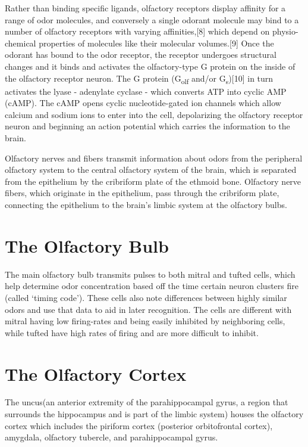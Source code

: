 Rather than binding specific ligands, olfactory receptors display affinity for a range of odor molecules, and conversely a single odorant molecule may bind to a number of olfactory receptors with varying affinities,{[}8{]} which depend on physio-chemical properties of molecules like their molecular volumes.{[}9{]} Once the odorant has bound to the odor receptor, the receptor undergoes structural changes and it binds and activates the olfactory-type G protein on the inside of the olfactory receptor neuron. The G protein (G\textsubscript{olf} and/or G\textsubscript{s}){[}10{]} in turn activates the lyase - adenylate cyclase - which converts ATP into cyclic AMP (cAMP). The cAMP opens cyclic nucleotide-gated ion channels which allow calcium and sodium ions to enter into the cell, depolarizing the olfactory receptor neuron and beginning an action potential which carries the information to the brain.

Olfactory nerves and fibers transmit information about odors from the peripheral olfactory system to the central olfactory system of the brain, which is separated from the epithelium by the cribriform plate of the ethmoid bone. Olfactory nerve fibers, which originate in the epithelium, pass through the cribriform plate, connecting the epithelium to the brain's limbic system at the olfactory bulbs.

\hypertarget{the-olfactory-bulb}{%
\section{The Olfactory Bulb}\label{the-olfactory-bulb}}

The main olfactory bulb transmits pulses to both mitral and tufted cells, which help determine odor concentration based off the time certain neuron clusters fire (called `timing code'). These cells also note differences between highly similar odors and use that data to aid in later recognition. The cells are different with mitral having low firing-rates and being easily inhibited by neighboring cells, while tufted have high rates of firing and are more difficult to inhibit.

\hypertarget{the-olfactory-cortex}{%
\section{The Olfactory Cortex}\label{the-olfactory-cortex}}

The uncus(an anterior extremity of the parahippocampal gyrus, a region that surrounds the hippocampus and is part of the limbic system) houses the olfactory cortex which includes the piriform cortex (posterior orbitofrontal cortex), amygdala, olfactory tubercle, and parahippocampal gyrus.

